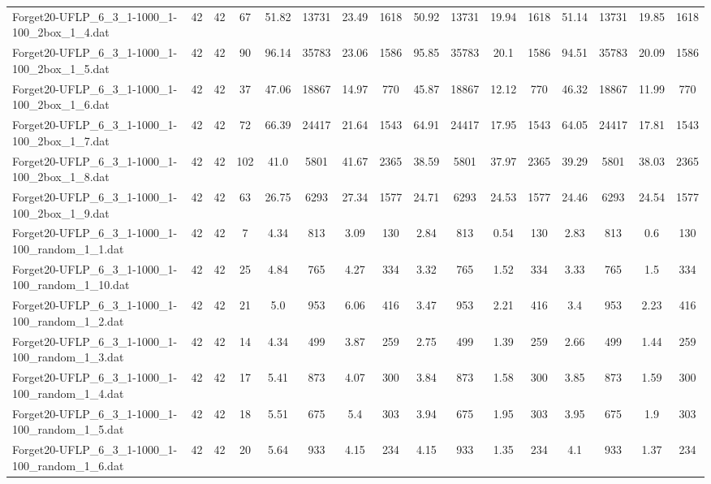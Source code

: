 \begin{sidewaystable}[!ht]
{\begin{tabular}{lccccccccccccccc}
Forget20-UFLP\_6\_3\_1-1000\_1-100\_2box\_1\_4.dat & 42 & 42 & 67 & 51.82 & 13731 & 23.49 & 1618 & 50.92 & 13731 & 19.94 & 1618 & 51.14 & 13731 &  \textcolor{blue2}{19.85} & 1618 \\
Forget20-UFLP\_6\_3\_1-1000\_1-100\_2box\_1\_5.dat & 42 & 42 & 90 & 96.14 & 35783 & 23.06 & 1586 & 95.85 & 35783 & 20.1 & 1586 & 94.51 & 35783 & 20.09 & 1586 \\
Forget20-UFLP\_6\_3\_1-1000\_1-100\_2box\_1\_6.dat & 42 & 42 & 37 & 47.06 & 18867 & 14.97 & 770 & 45.87 & 18867 & 12.12 & 770 & 46.32 & 18867 & 11.99 & 770 \\
Forget20-UFLP\_6\_3\_1-1000\_1-100\_2box\_1\_7.dat & 42 & 42 & 72 & 66.39 & 24417 & 21.64 & 1543 & 64.91 & 24417 & 17.95 & 1543 & 64.05 & 24417 &  \textcolor{blue2}{17.81} & 1543 \\
Forget20-UFLP\_6\_3\_1-1000\_1-100\_2box\_1\_8.dat & 42 & 42 & 102 & 41.0 & 5801 & 41.67 & 2365 & 38.59 & 5801 &  \textcolor{blue2}{37.97} & 2365 & 39.29 & 5801 & 38.03 & 2365 \\
Forget20-UFLP\_6\_3\_1-1000\_1-100\_2box\_1\_9.dat & 42 & 42 & 63 & 26.75 & 6293 & 27.34 & 1577 & 24.71 & 6293 & 24.53 & 1577 &  \textcolor{blue2}{24.46} & 6293 & 24.54 & 1577 \\
Forget20-UFLP\_6\_3\_1-1000\_1-100\_random\_1\_1.dat & 42 & 42 & 7 & 4.34 & 813 & 3.09 & 130 & 2.84 & 813 &  \textcolor{blue2}{0.54} & 130 & 2.83 & 813 & 0.6 & 130 \\
Forget20-UFLP\_6\_3\_1-1000\_1-100\_random\_1\_10.dat & 42 & 42 & 25 & 4.84 & 765 & 4.27 & 334 & 3.32 & 765 & 1.52 & 334 & 3.33 & 765 &  \textcolor{blue2}{1.5} & 334 \\
Forget20-UFLP\_6\_3\_1-1000\_1-100\_random\_1\_2.dat & 42 & 42 & 21 & 5.0 & 953 & 6.06 & 416 & 3.47 & 953 & 2.21 & 416 & 3.4 & 953 & 2.23 & 416 \\
Forget20-UFLP\_6\_3\_1-1000\_1-100\_random\_1\_3.dat & 42 & 42 & 14 & 4.34 & 499 & 3.87 & 259 & 2.75 & 499 &  \textcolor{blue2}{1.39} & 259 & 2.66 & 499 & 1.44 & 259 \\
Forget20-UFLP\_6\_3\_1-1000\_1-100\_random\_1\_4.dat & 42 & 42 & 17 & 5.41 & 873 & 4.07 & 300 & 3.84 & 873 & 1.58 & 300 & 3.85 & 873 & 1.59 & 300 \\
Forget20-UFLP\_6\_3\_1-1000\_1-100\_random\_1\_5.dat & 42 & 42 & 18 & 5.51 & 675 & 5.4 & 303 & 3.94 & 675 & 1.95 & 303 & 3.95 & 675 &  \textcolor{blue2}{1.9} & 303 \\
Forget20-UFLP\_6\_3\_1-1000\_1-100\_random\_1\_6.dat & 42 & 42 & 20 & 5.64 & 933 & 4.15 & 234 & 4.15 & 933 &  \textcolor{blue2}{1.35} & 234 & 4.1 & 933 & 1.37 & 234 \\

\end{tabular}}
\end{sidewaystable}
